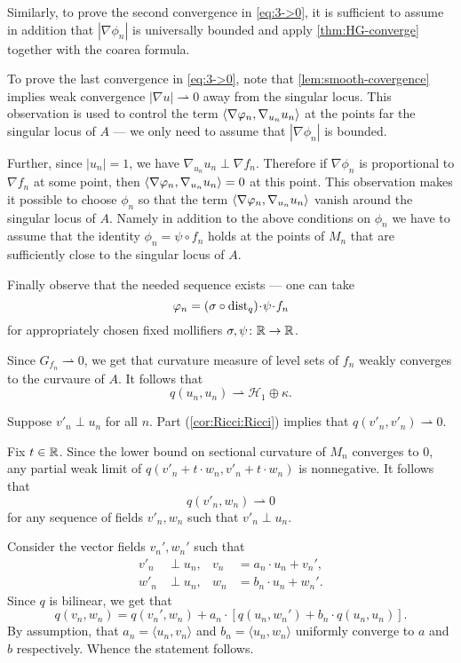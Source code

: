 Similarly, to prove the second convergence in \ref{eq:3->0}, it is sufficient to assume in addition that $|\nabla\phi_n|$ is universally bounded and apply \ref{thm:HG-converge} together with the coarea formula.

To prove the last convergence in \ref{eq:3->0}, note that \ref{lem:smooth-covergence} implies weak convergence
$|\nabla u|\rightharpoonup0$ away from the singular locus.
This observation is used to control the term $\langle\nabla\varphi_n,\nabla_{u_n} {u_n}\rangle$ at the points far the singular locus of $A$ --- we only need to assume that $|\nabla\phi_n|$ is bounded.

Further, since $|u_n|=1$, we have $\nabla_{u_n} u_n\perp \nabla f_n$.
Therefore if $\nabla \phi_n$ is proportional to $\nabla f_n$ at some point, then $\langle\nabla\varphi_n,\nabla_{u_n} {u_n}\rangle=0$ at this point.
This observation makes it possible to choose $\phi_n$ so that the term $\langle\nabla\varphi_n,\nabla_{u_n} {u_n}\rangle$ vanish around the singular locus of $A$.
Namely in addition to the above conditions on $\phi_n$ we have to assume that the identity $\phi_n=\psi\circ f_n$ holds at the points of $M_n$ that are sufficiently close to the singular locus of $A$.

Finally observe that the needed sequence exists ---
one can take 
\[\phi_n=(\sigma\circ \dist_q)\cdot \psi\cdot f_n\]
for appropriately chosen fixed mollifiers $\sigma,\psi\colon\mathbb{R}\to \mathbb{R}$.

Since $G_{f_n}\rightharpoonup 0$, we get that curvature measure of level sets of $f_n$ weakly converges to the curvaure of $A$.
It follows that 
\[q(u_n,u_n)\rightharpoonup \mathcal{H}_1\oplus \kappa.\]

Suppose $v'_n\perp u_n$ for all $n$.
Part (\ref{cor:Ricci:Ricci}) implies that  $q(v'_n,v'_n)\rightharpoonup 0$.

Fix $t\in \mathbb{R}$.
Since the lower bound on sectional curvature of $M_n$ converges to $0$, any partial weak limit of $q(v'_n+t\cdot w_n,v'_n+t\cdot w_n)$ is nonnegative.
It follows that 
\[q(v'_n, w_n)\rightharpoonup 0\] for any sequence of fields $v'_n,w_n$ such that $v'_n\perp u_n$.

Consider the vector fields $v_n',w_n'$ such that 
\begin{align*}
v'_n&\perp u_n,
&
v_n&=a_n\cdot u_n+v_n',
\\
w'_n&\perp u_n,
&
w_n&=b_n\cdot u_n+w_n'.
\end{align*}
Since $q$ is bilinear, we get that
\[q(v_n,w_n)=q(v_n',w_n) + a_n\cdot [q(u_n,w_n')+ b_n\cdot q(u_n,u_n)].\]
By assumption, that $a_n=\langle u_n,v_n\rangle $ and $b_n=\langle u_n,w_n\rangle$ uniformly converge to $a$ and $b$ respectively.
Whence the statement follows.
 

\qeds
